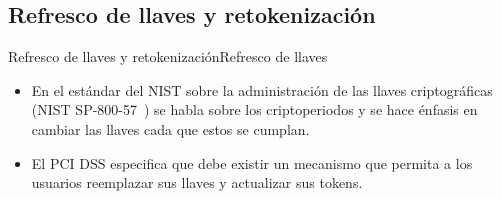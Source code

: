 %
%
%

\subsection{Refresco de llaves y retokenización}

\begin{frame}{Refresco de llaves y retokenización}{Refresco de llaves}
  \begin{itemize}
    \item En el estándar del NIST sobre la administración de las llaves
    criptográficas (NIST SP-800-57~\cite{nist_llaves}) se habla sobre los
    criptoperiodos y se hace énfasis en cambiar las llaves cada que estos se
    cumplan.
    \item El PCI DSS especifica que debe existir un mecanismo que permita a los
    usuarios reemplazar sus llaves y actualizar sus tokens.

  \end{itemize}

\end{frame}

